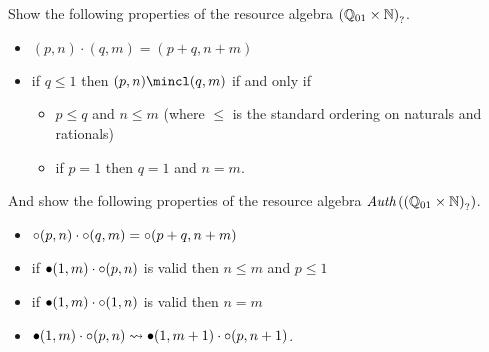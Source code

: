\begin{exercise}
  \label{exercise:properties-of-fractional-natural-auth-ra}
  Show the following properties of the resource algebra $\left(\mathbb{Q}_{01} \times \mathbb{N}\right)_?$.
  \begin{itemize}
  \item $(p, n) \cdot (q, m) = (p + q, n + m)$
  \item if $q \leq 1$ then $(p, n) \mincl (q, m)$ if and only if
    \begin{itemize}
    \item $p \leq q$ and $n \leq m$ (where $\leq$ is the standard ordering on naturals and rationals)
    \item if $p = 1$ then $q = 1$ and $n = m$.
    \end{itemize}
  \end{itemize}
  And show the following properties of the resource algebra $\textit{Auth}\left(\left(\mathbb{Q}_{01} \times \mathbb{N}\right)_?\right)$.
  \begin{itemize}
  \item $\mathord{\circ} (p, n) \cdot \mathord{\circ} (q, m) = \mathord{\circ}(p + q, n + m)$
  \item if $\mathord{\bullet} (1, m) \cdot \mathord{\circ}(p, n)$ is valid then $n \leq m$ and $p \leq 1$
  \item if $\mathord{\bullet} (1, m) \cdot \mathord{\circ}(1, n)$ is valid then $n = m$
  \item $\mathord{\bullet} (1, m) \cdot \mathord{\circ} (p, n) \rightsquigarrow \mathord{\bullet} (1, m+1) \cdot \mathord{\circ} (p, n+1)$.\qedhere
  \end{itemize}
\end{exercise}

